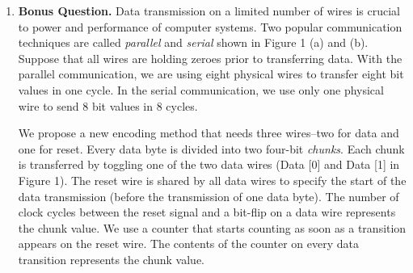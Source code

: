 \documentclass[a4paper, 15pt]{exam}
\begin{document}
\begin{enumerate}
\item \textbf{Bonus Question.} 
Data transmission on a limited number of wires is crucial to power and performance of computer systems. Two popular communication techniques are called \textit{parallel} and \textit{serial} shown in Figure 1 (a) and (b).
Suppose that all wires are holding zeroes prior to transferring data. With the parallel communication, we are using eight physical wires to transfer eight bit values in one cycle. In the serial communication, we use only one physical wire to send 8 bit values in 8 cycles.
\begin{center}
\end{center}




We propose a new encoding method that needs three wires--two for data and one for reset. Every data byte is divided into two four-bit \textit{chunks}. Each chunk is transferred by toggling one of the two data wires (Data [0] and Data [1] in Figure 1). The reset wire is shared by all data wires to specify the start of the data transmission (before the transmission of one data byte).  The number of clock cycles between the reset signal and a bit-flip on a data wire represents the chunk value. We use a counter that starts counting as soon as a transition appears on the reset wire. The contents of the counter on every data transition represents the chunk value.



\end{enumerate}
\end{document}
